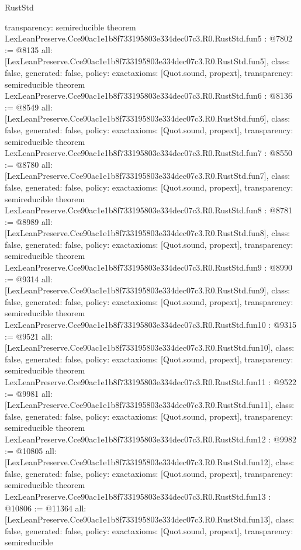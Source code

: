 \begin{lexlean}{RustStd}
\begin{coremodule}
{  transparency: semireducible
}
theorem LexLeanPreserve.Cce90ac1e1b8f733195803e334dec07c3.R0.RustStd.fun5 : @7802 := @8135 {
  all: [LexLeanPreserve.Cce90ac1e1b8f733195803e334dec07c3.R0.RustStd.fun5],
  class: false,
  generated: false,
  policy: exact{axioms: [Quot.sound, propext]},
  transparency: semireducible
}
theorem LexLeanPreserve.Cce90ac1e1b8f733195803e334dec07c3.R0.RustStd.fun6 : @8136 := @8549 {
  all: [LexLeanPreserve.Cce90ac1e1b8f733195803e334dec07c3.R0.RustStd.fun6],
  class: false,
  generated: false,
  policy: exact{axioms: [Quot.sound, propext]},
  transparency: semireducible
}
theorem LexLeanPreserve.Cce90ac1e1b8f733195803e334dec07c3.R0.RustStd.fun7 : @8550 := @8780 {
  all: [LexLeanPreserve.Cce90ac1e1b8f733195803e334dec07c3.R0.RustStd.fun7],
  class: false,
  generated: false,
  policy: exact{axioms: [Quot.sound, propext]},
  transparency: semireducible
}
theorem LexLeanPreserve.Cce90ac1e1b8f733195803e334dec07c3.R0.RustStd.fun8 : @8781 := @8989 {
  all: [LexLeanPreserve.Cce90ac1e1b8f733195803e334dec07c3.R0.RustStd.fun8],
  class: false,
  generated: false,
  policy: exact{axioms: [Quot.sound, propext]},
  transparency: semireducible
}
theorem LexLeanPreserve.Cce90ac1e1b8f733195803e334dec07c3.R0.RustStd.fun9 : @8990 := @9314 {
  all: [LexLeanPreserve.Cce90ac1e1b8f733195803e334dec07c3.R0.RustStd.fun9],
  class: false,
  generated: false,
  policy: exact{axioms: [Quot.sound, propext]},
  transparency: semireducible
}
theorem LexLeanPreserve.Cce90ac1e1b8f733195803e334dec07c3.R0.RustStd.fun10 : @9315 := @9521 {
  all: [LexLeanPreserve.Cce90ac1e1b8f733195803e334dec07c3.R0.RustStd.fun10],
  class: false,
  generated: false,
  policy: exact{axioms: [Quot.sound, propext]},
  transparency: semireducible
}
theorem LexLeanPreserve.Cce90ac1e1b8f733195803e334dec07c3.R0.RustStd.fun11 : @9522 := @9981 {
  all: [LexLeanPreserve.Cce90ac1e1b8f733195803e334dec07c3.R0.RustStd.fun11],
  class: false,
  generated: false,
  policy: exact{axioms: [Quot.sound, propext]},
  transparency: semireducible
}
theorem LexLeanPreserve.Cce90ac1e1b8f733195803e334dec07c3.R0.RustStd.fun12 : @9982 := @10805 {
  all: [LexLeanPreserve.Cce90ac1e1b8f733195803e334dec07c3.R0.RustStd.fun12],
  class: false,
  generated: false,
  policy: exact{axioms: [Quot.sound, propext]},
  transparency: semireducible
}
theorem LexLeanPreserve.Cce90ac1e1b8f733195803e334dec07c3.R0.RustStd.fun13 : @10806 := @11364 {
  all: [LexLeanPreserve.Cce90ac1e1b8f733195803e334dec07c3.R0.RustStd.fun13],
  class: false,
  generated: false,
  policy: exact{axioms: [Quot.sound, propext]},
  transparency: semireducible
}
\end{coremodule}
\end{lexlean}
